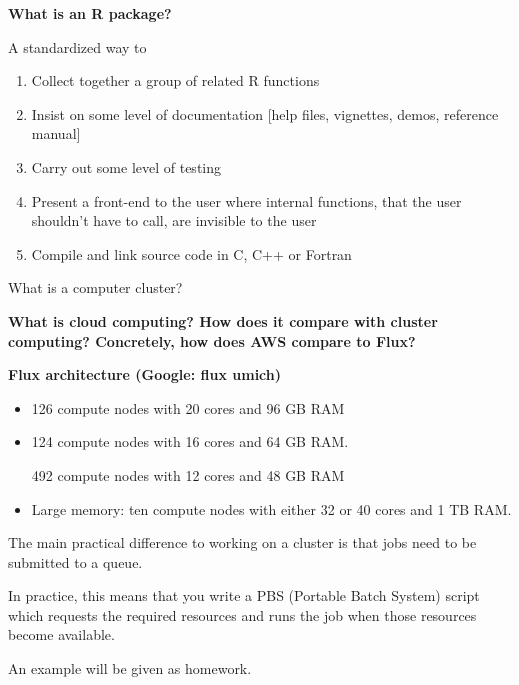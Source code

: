 \documentclass[portrait,11pt]{seminar}
\begin{document}
\bs


{\bf What is an R package?}

A standardized way to 
\begin{enumerate}
\item Collect together a group of related R functions
\item Insist on some level of documentation [help files, vignettes, demos, reference manual]
\item Carry out some level of testing
\item Present a front-end to the user where internal functions, that the 
user shouldn't have to call, are invisible to the user
\item Compile and link source code in C, C++ or Fortran
\end{enumerate}

\es

\bs
{\bf

What is a computer cluster?
}
 
\vspace{2cm}

{\bf
What is cloud computing? How does it compare with cluster computing?
Concretely, how does AWS compare to Flux?
}

\es
\bs

{ \bf Flux architecture (Google: flux umich)}
\begin{itemize}
\item   
126 compute nodes with 20 cores and 96 GB RAM
    
\item
124 compute nodes with 16 cores and 64 GB RAM.

492 compute nodes with 12 cores and 48 GB RAM
\item
Large memory: ten compute nodes with either 32 or 40 cores and 1 TB RAM.
\end{itemize}

\es

\bs
The main practical difference to working on a cluster is that jobs need to be submitted to a queue. 
\begin{myitemize}
\item 
In practice, this means that you write a PBS (Portable Batch System) script which requests the required resources and runs the job when those resources become available.

\item
An example will be given as homework.
\end{myitemize}
\end{document}
